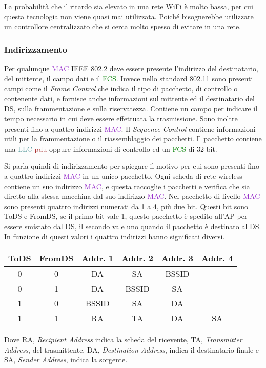 \documentclass{article}
\numberwithin{equation}{subsection}
\begin{document}
La probabilità che il ritardo sia elevato in una rete \textcolor{Sepia}{WiFi} è molto bassa, per cui questa tecnologia non viene quasi mai utilizzata. Poiché bisognerebbe 
utilizzare un controllore centralizzato che si cerca molto spesso di evitare in una rete. 

\subsubsection{Indirizzamento}

Per qualunque \textcolor{DarkOrchid}{MAC} IEEE 802.2 deve essere presente l'indirizzo del destinatario, del mittente, il campo dati e il \textcolor{Green}{FCS}. 
Invece nello standard 802.11 sono presenti campi come il \textit{Frame Control} che indica il tipo di pacchetto, di controllo o contenente dati, e fornisce anche informazioni 
sul mittente ed il destinatario del \textcolor{RawSienna}{DS}, sulla frammentazione e sulla riservatezza. Contiene un campo per indicare il tempo necessario in cui deve 
essere effettuata la trasmissione. Sono inoltre presenti fino a quattro indirizzi \textcolor{DarkOrchid}{MAC}. Il \textit{Sequence Control} contiene informazioni utili per la frammentazione o il riassemblaggio 
dei pacchetti. Il pacchetto contiene una \textcolor{CadetBlue}{LLC} \textcolor{Brown}{pdu} oppure informazioni di controllo ed un \textcolor{Green}{FCS} di 32 bit. 


Si parla quindi di indirizzamento per spiegare il motivo per cui sono presenti fino a quattro indirizzi \textcolor{DarkOrchid}{MAC} in un unico pacchetto. Ogni scheda di rete 
wireless contiene un suo indirizzo \textcolor{DarkOrchid}{MAC}, e questa raccoglie i pacchetti e verifica che sia diretto alla stessa macchina dal suo indirizzo \textcolor{DarkOrchid}{MAC}. Nel pacchetto di livello \textcolor{DarkOrchid}{MAC} 
sono presenti quattro indirizzi numerati da 1 a 4, più due bit. Questi bit sono ToDS e FromDS, se il primo bit vale 1, questo pacchetto è spedito all'\textcolor{PineGreen}{AP} per essere 
smistato dal \textcolor{RawSienna}{DS}, il secondo vale uno quando il pacchetto è destinato al \textcolor{RawSienna}{DS}. In funzione di questi valori i quattro indirizzi hanno significati diversi. 

\begin{center}
    \begin{tabular}{|c|c|c|c|c|c|}
        \hline
        ToDS& FromDS& Addr. 1& Addr. 2 &Addr. 3&Addr. 4\\\hline
        0&0&DA&SA&\textcolor{Rhodamine}{BSSID}&\\\hline
        0&1&DA&\textcolor{Rhodamine}{BSSID}&SA&\\\hline
        1&0&\textcolor{Rhodamine}{BSSID}&SA&DA&\\\hline
        1&1&RA&TA&DA&SA\\\hline        
    \end{tabular}
\end{center}
Dove RA, \textit{Recipient \textit{Address}} indica la scheda del ricevente, TA, \textit{Transmitter \textit{Address}}, del trasmittente. DA, \textit{Destination \textit{Address}}, indica il destinatario finale e SA, \textit{Sender \textit{Address}}, indica la sorgente. 
\end{document}
